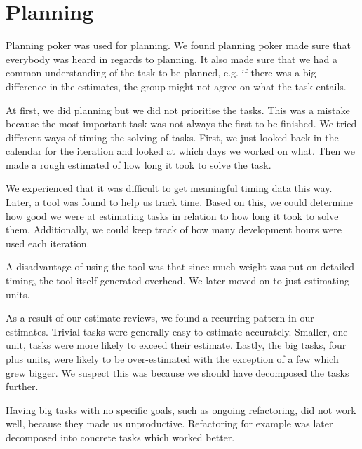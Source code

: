\section{Planning}
Planning poker was used for planning. We found planning poker made sure that everybody was heard in regards to planning. It also made sure that we had a common understanding of the task to be planned, e.g. if there was a big difference in the estimates, the group might not agree on what the task entails.

At first, we did planning but we did not prioritise the tasks. This was a mistake because the most important task was not always the first to be finished. We tried different ways of timing the solving of tasks. First, we just looked back in the calendar for the iteration and looked at which days we worked on what. Then we made a rough estimated of how long it took to solve the task. 

We experienced that it was difficult to get meaningful timing data this way. Later, a tool was found to help us track time. Based on this, we could determine how good we were at estimating tasks in relation to how long it took to solve them. Additionally, we could keep track of how many development hours were used each iteration. 

A disadvantage of using the tool was that since much weight was put on detailed timing, the tool itself generated overhead. We later moved on to just estimating units.

As a result of our estimate reviews, we found a recurring pattern in our estimates. Trivial tasks were generally easy to estimate accurately. Smaller, one unit, tasks were more likely to exceed their estimate. Lastly, the big tasks, four plus units, were likely to be over-estimated with the exception of a few which grew bigger. We suspect this was because we should have decomposed the tasks further.

Having big tasks with no specific goals, such as ongoing refactoring, did not work well, because they made us unproductive. Refactoring for example was later decomposed into concrete tasks which worked better.